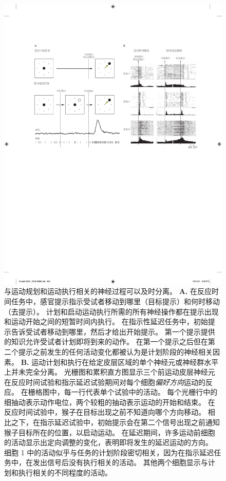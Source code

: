\begin{figure}[htbp]
	\centering
	\includegraphics[width=1.0\linewidth]{chap34/fig_34_4}
	\caption{与运动规划和运动执行相关的神经过程可以及时分离\cite{crammond2000prior}。
		\textbf{A.} 在反应时间任务中，感官提示指示受试者移动到哪里（目标提示）和何时移动（去提示）。
		计划和启动运动执行所需的所有神经操作都在提示出现和运动开始之间的短暂时间内执行。
		在指示性延迟任务中，初始提示告诉受试者移动到哪里，然后才给出开始提示。
		第一个提示提供的知识允许受试者计划即将到来的动作。
		在第一个提示之后但在第二个提示之前发生的任何活动变化都被认为是计划阶段的神经相关因素。
		\textbf{B.} 运动计划和执行在给定皮层区域的单个神经元或神经群水平上并未完全分离。
		光栅图和累积直方图显示三个前运动皮层神经元在反应时间试验和指示延迟试验期间对每个细胞\textit{偏好方向}运动的反应。
		在栅格图中，每一行代表单个试验中的活动。
		每个光栅行中的细抽动表示动作电位，两个较粗的抽动表示运动的开始和结束。
		在反应时间试验中，猴子在目标出现之前不知道向哪个方向移动。
		相比之下，在指示延迟试验中，初始提示会在第二个信号出现之前通知猴子目标所在的位置，以启动运动。
		在延迟期间，许多运动前细胞的活动显示出定向调整的变化，表明即将发生的延迟运动的方向。
		细胞 1 中的活动似乎与任务的计划阶段密切相关，因为在指示延迟任务中，在发出信号后没有执行相关的活动。
		其他两个细胞显示与计划和执行相关的不同程度的活动。}
	\label{fig:34_4}
\end{figure}


